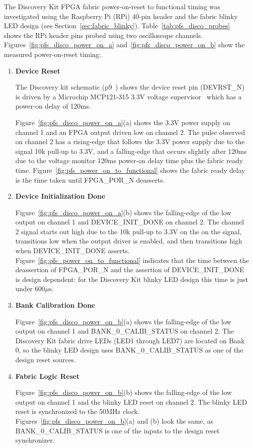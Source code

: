 The Discovery Kit FPGA fabric power-on-reset to functional timing was investigated
using the Raspberry Pi (RPi) 40-pin header and the fabric blinky LED design
(see Section~\ref{sec:fabric_blinky}).
Table~\ref{tab:pfs_disco_probes} shows the RPi header pins
probed using two oscilloscope channels.
%
Figures~\ref{fig:pfs_disco_power_on_a} and~\ref{fig:pfs_disco_power_on_b} show
the measured power-on-reset timing:
%
\begin{enumerate}
\item \textbf{Device Reset}

The Discovery kit schematic (p9~\cite{Microchip_DISCO_SCH_2023}) shows the
device reset pin (DEVRST\_N) is driven by a Microchip MCP121-315 3.3V
voltage supervisor~\cite{Microchip_MCP121_2023} which has a power-on delay of 120ms.

Figure~\ref{fig:pfs_disco_power_on_a}(a) shows the 3.3V power supply on channel 1
and an FPGA output driven low on channel 2. The pulse observed on channel 2
has a rising-edge that follows the 3.3V power supply due to the signal 10k
pull-up to 3.3V, and a falling-edge that occurs slightly after 120ms
due to the voltage monitor 120ms power-on delay time plus the fabric ready time.
Figure~\ref{fig:pfs_power_on_to_functional} shows the fabric ready delay is
the time taken until FPGA\_POR\_N deasserts.

\item \textbf{Device Initialization Done}

Figure~\ref{fig:pfs_disco_power_on_a}(b) shows the falling-edge of the low
output on channel 1 and DEVICE\_INIT\_DONE on channel 2. The channel 2
signal starts out high due to the 10k pull-up to 3.3V on the on the signal,
transitions low when the output driver is enabled, and then transitions
high when DEVICE\_INIT\_DONE asserts.
%
Figure~\ref{fig:pfs_power_on_to_functional} indicates that the time between
the deassertion of FPGA\_POR\_N and the assertion of DEVICE\_INIT\_DONE
is design dependent: for the Discovery Kit blinky LED design this time is
just under 600$\mu$s.

\item \textbf{Bank Calibration Done}

Figure~\ref{fig:pfs_disco_power_on_b}(a) shows the falling-edge of the low
output on channel 1 and BANK\_0\_CALIB\_STATUS on channel 2.
%
The Discovery Kit fabric drive LEDs (LED1 through LED7) are located on Bank 0,
so the blinky LED design uses BANK\_0\_CALIB\_STATUS as one of the design
reset sources.

\item \textbf{Fabric Logic Reset}

Figure~\ref{fig:pfs_disco_power_on_b}(b) shows the falling-edge of the low
output on channel 1 and the blinky LED reset on channel 2.
The blinky LED reset is synchronized to the 50MHz clock.
%
Figures~\ref{fig:pfs_disco_power_on_b}(a) and (b) look the same, as
BANK\_0\_CALIB\_STATUS is one of the inputs to the design reset synchronizer.

\end{enumerate}

